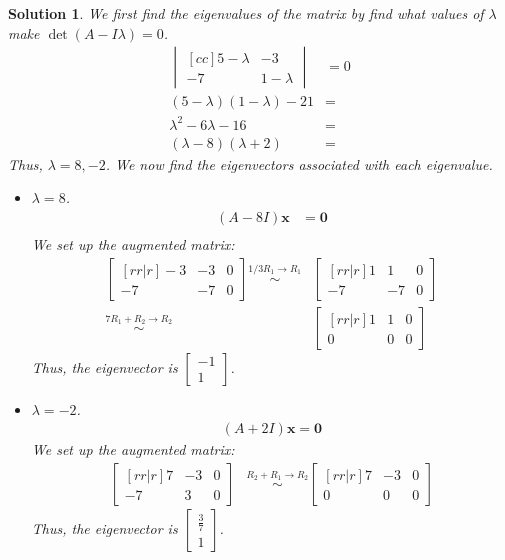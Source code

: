 \documentclass[11pt]{scrartcl}
\theoremstyle{dotlessP}
\newtheorem{sol}{Solution}[section]
\theoremstyle{dotlessN}
\begin{document}
\begin{sol}
	 We first find the eigenvalues of the matrix by find what values of $\lambda$ make $\det(A - I\lambda) = 0$.
	 \begin{align*}
		 \begin{vmatrix}[cc]
		5 - \lambda & -3 \\
		-7 & 1 - \lambda
	\end{vmatrix} &= 0 \\
	(5- \lambda)(1 - \lambda) - 21 &= \\
	\lambda^2 - 6\lambda - 16 &= \\
	(\lambda - 8)(\lambda + 2) &=
	 \end{align*}
	 Thus, $\lambda = 8, -2$. We now find the eigenvectors associated with each eigenvalue.
	 \begin{itemize}
		 \item $\lambda = 8$.
	 \begin{align*}
		 (A - 8I)\bm{x} &= \bm{0} \\
	 \end{align*}
	 We set up the augmented matrix:
	 \begin{align*}
		 \begin{bmatrix}[rr|r]
			 -3 & -3 & 0 \\
			 -7 & -7 & 0
		 \end{bmatrix} \stackrel{1/3 R_1 \to R_1}{\sim}
		 &\begin{bmatrix}[rr|r]
			 1 & 1 & 0 \\
			 -7 & -7 & 0
	 	\end{bmatrix} \\
		\stackrel{7R_1 + R_2 \to R_2}{\sim}
		 &\begin{bmatrix}[rr|r]
			 1 & 1 & 0 \\
			 0 & 0 & 0
	 	\end{bmatrix}
	 \end{align*}
	 Thus, the eigenvector is $
\begin{bmatrix}
	-1\\
	1 
\end{bmatrix}
	 $.
	 \item $\lambda = -2$.
		 \begin{align*}
			 (A + 2I)\bm{x} = \bm{0}
		 \end{align*}
		We set up the augmented matrix:
		\begin{align*}
			\begin{bmatrix}[rr|r]
				7 & -3 & 0 \\
				-7 & 3 & 0
			\end{bmatrix} &\stackrel{R_2 + R_1 \to R_2}{\sim}
			\begin{bmatrix}[rr|r]
				7 & -3 & 0 \\
				0 & 0 & 0
			\end{bmatrix}
		\end{align*}
		Thus, the eigenvector is $
\begin{bmatrix}
	\frac{3}{7} \\
	1 
\end{bmatrix}
		$.
		\\


\end{itemize}
\end{sol}
\end{document}
